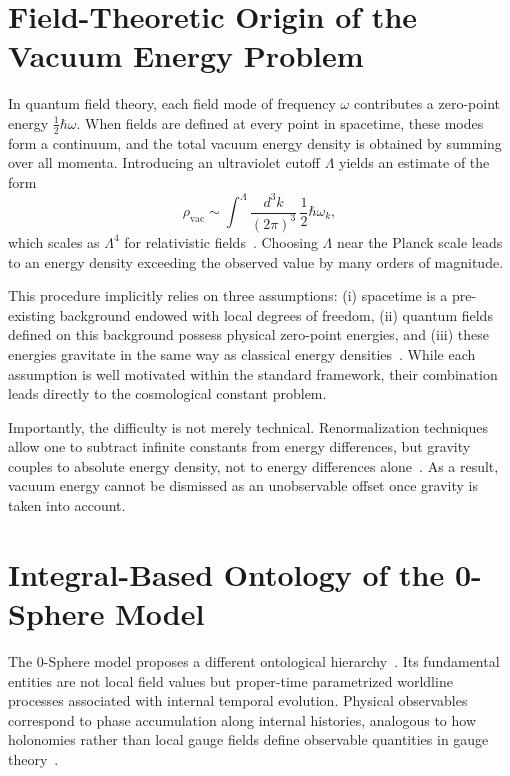\documentclass[%
 reprint,
 amsmath,amssymb,
 aps,
 prb,
]{revtex4-2}
\numberwithin{equation}{section}
\begin{document}
\section{Field-Theoretic Origin of the Vacuum Energy Problem}
\label{sec:field_origin}

In quantum field theory, each field mode of frequency $\omega$ contributes a zero-point energy $\tfrac{1}{2}\hbar\omega$. When fields are defined at every point in spacetime, these modes form a continuum, and the total vacuum energy density is obtained by summing over all momenta. Introducing an ultraviolet cutoff $\Lambda$ yields an estimate of the form
\begin{equation}
\rho_{\mathrm{vac}} \sim \int^{\Lambda} \frac{d^3k}{(2\pi)^3} \, \frac{1}{2}\hbar\omega_k,
\end{equation}
which scales as $\Lambda^4$ for relativistic fields~\cite{Weinberg1989}. Choosing $\Lambda$ near the Planck scale leads to an energy density exceeding the observed value by many orders of magnitude.

This procedure implicitly relies on three assumptions: (i) spacetime is a pre-existing background endowed with local degrees of freedom, (ii) quantum fields defined on this background possess physical zero-point energies, and (iii) these energies gravitate in the same way as classical energy densities~\cite{Zeldovich1967}. While each assumption is well motivated within the standard framework, their combination leads directly to the cosmological constant problem.

Importantly, the difficulty is not merely technical. Renormalization techniques allow one to subtract infinite constants from energy differences, but gravity couples to absolute energy density, not to energy differences alone~\cite{Weinberg1989}. As a result, vacuum energy cannot be dismissed as an unobservable offset once gravity is taken into account.

\section{Integral-Based Ontology of the 0-Sphere Model}
\label{sec:integral_ontology}

The 0-Sphere model proposes a different ontological hierarchy~\cite{hanamura18067760,hanamura18135855,hanamura18203433}. Its fundamental entities are not local field values but proper-time parametrized worldline processes associated with internal temporal evolution. Physical observables correspond to phase accumulation along internal histories, analogous to how holonomies rather than local gauge fields define observable quantities in gauge theory~\cite{AharonovBohm1959,Berry1984}.
\end{document}
